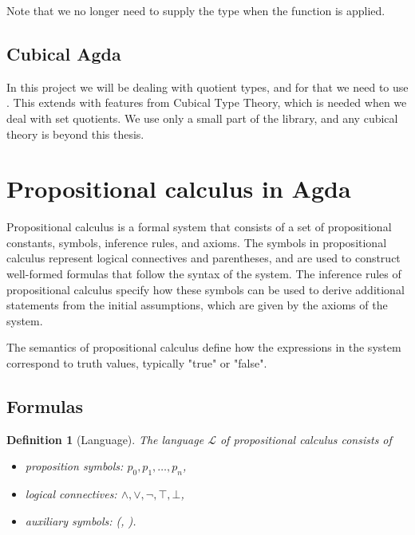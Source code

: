 \documentclass[titlepage]{article}
\newtheorem{definition}{Definition}[section]
\begin{document}
Note that we no longer need to supply the type when the function is applied.


\subsection{Cubical Agda}
In this project we will be dealing with quotient types, and for that we need to use \CubicalAgda. This extends \Agda with features from Cubical Type Theory, which is needed when we deal with set quotients.\cite{AgdaDoc} We use only a small part of the \agdaCubical library, and any cubical theory is beyond this thesis.



\section{Propositional calculus in Agda}

Propositional calculus is a formal system that consists of a set of propositional constants, symbols, inference rules, and axioms. The symbols in propositional calculus represent logical connectives and parentheses, and are used to construct well-formed formulas that follow the syntax of the system. The inference rules of propositional calculus specify how these symbols can be used to derive additional statements from the initial assumptions, which are given by the axioms of the system.

The semantics of propositional calculus define how the expressions in the system correspond to truth values, typically "true" or "false". 



\subsection{Formulas}

\begin{definition}[Language]\label{language}
    The language $\mathcal{L}$ of propositional calculus consists of
    \begin{itemize}
        \item proposition symbols: $p_0,p_1,\hdots,p_n$,
        \item logical connectives: $\wedge,\vee,\neg,\top,\bot$,
        \item auxiliary symbols: (, ).
    \end{itemize}
\end{definition}
\end{document}
